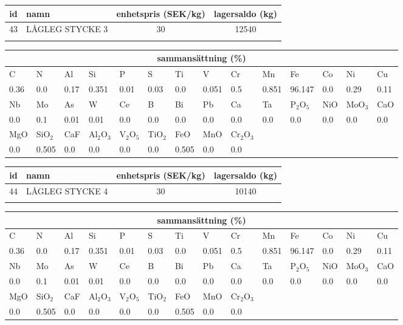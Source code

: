 \begin{center}
{\scriptsize\addtolength{\tabcolsep}{-3pt}
\begin{tabular}{clcc}
id&namn&enhetspris (SEK/kg)&lagersaldo (kg)\\
\hline
43&LÅGLEG STYCKE 3&30&12540\\\\
\end{tabular}
\begin{tabular}{llllllllllllll}
\multicolumn{14}{c}{sammansättning (\%)}\\
\hline
C&N&Al&Si&P&S&Ti&V&Cr&Mn&Fe&Co&Ni&Cu\\
\hline
0.36&0.0&0.17&0.351& 0.01&0.03&0.0&0.051& 0.5&0.851&96.147&0.0& 0.29&0.11\\
\hline
Nb&Mo&As&W&Ce&B&Bi&Pb&Ca&Ta&P$_2$O$_5$&NiO&MoO$_3$&CaO\\
\hline
0.0& 0.1& 0.01& 0.01& 0.0& 0.0& 0.0& 0.0& 0.0& 0.0& 0.0& 0.0& 0.0& 0.0\\
\hline
MgO&SiO$_2$&CaF&Al$_2$O$_3$&V$_2$O$_5$&TiO$_2$&FeO&MnO&Cr$_2$O$_3$\\
\hline
0.0& 0.505& 0.0& 0.0& 0.0& 0.0& 0.505& 0.0& 0.0\\
\end{tabular}
}
\end{center}

\begin{center}
{\scriptsize\addtolength{\tabcolsep}{-3pt}
\begin{tabular}{clcc}
id&namn&enhetspris (SEK/kg)&lagersaldo (kg)\\
\hline
44&LÅGLEG STYCKE 4&30&10140\\\\
\end{tabular}
\begin{tabular}{llllllllllllll}
\multicolumn{14}{c}{sammansättning (\%)}\\
\hline
C&N&Al&Si&P&S&Ti&V&Cr&Mn&Fe&Co&Ni&Cu\\
\hline
0.36&0.0&0.17&0.351& 0.01&0.03&0.0&0.051& 0.5&0.851&96.147&0.0& 0.29&0.11\\
\hline
Nb&Mo&As&W&Ce&B&Bi&Pb&Ca&Ta&P$_2$O$_5$&NiO&MoO$_3$&CaO\\
\hline
0.0& 0.1& 0.01& 0.01& 0.0& 0.0& 0.0& 0.0& 0.0& 0.0& 0.0& 0.0& 0.0& 0.0\\
\hline
MgO&SiO$_2$&CaF&Al$_2$O$_3$&V$_2$O$_5$&TiO$_2$&FeO&MnO&Cr$_2$O$_3$\\
\hline
0.0& 0.505& 0.0& 0.0& 0.0& 0.0& 0.505& 0.0& 0.0\\
\end{tabular}
}
\end{center}

